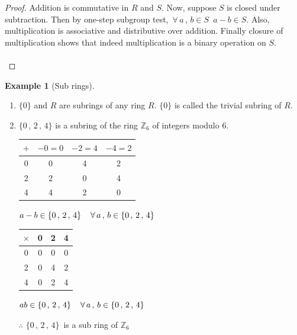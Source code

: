\documentclass[11pt,a4paper]{article}
\theoremstyle{definition}
\newtheorem{exa}[thm]{Example}
\begin{document}
\begin{proof}
Addition is commutative in $R$ and $S$. Now, suppose $S$ is closed under subtraction. Then by one-step subgroup test, $\, \forall\, a\, , \, b\in S\,\,\, a-b\in S$. Also, multiplication is associative and distributive over addition. Finally closure of multiplication shows that indeed multiplication is a binary operation on $S$.\\\\








\pagebreak
\end{proof}
\begin{exa}[Sub rings]
\begin{enumerate}
\item $\{0\}$ and $R$ are subrings of any ring $R$. $\{0\}$ is called the trivial subring of $R$.

\item $\{0\,, \, 2\, , \, 4\}$ is a subring of the ring $\mathbb{Z}_6$ of integers modulo 6.\\

\begin{table}[H]
\centering
\begin{tabular}{c|c|c|c}
$+$ & $-0 = 0$ & $-2 = 4$ & $-4 = 2$\\
\hline
0 & 0 & 4 & 2\\
2 & 2 & 0 & 4\\
4 & 4 & 2 & 0\\
\hline
\end{tabular}
\hspace{1.5cm} $a - b \in \{0\, , \, 2 \, , \, 4\}\hspace{0.4cm}\forall\, a\, , \, b\in \{0\, , \, 2 \, , \, 4\}$
\end{table}


\begin{table}[H]
\centering
\begin{tabular}{|c|c|c|c|}
\hline
$\times$ & 0 & 2 & 4\\
\hline
0 & 0 & 0 & 0 \\
2 & 0 & 4 & 2\\
4 & 0 & 2 & 4\\
\hline
\end{tabular}
\hspace{1.5cm} $ab\in \{0\, , \, 2 \, , \, 4\}\hspace{0.4cm}\forall\, a\, , \, b \in\{0\, , \, 2 \, , \, 4\}$
\end{table}
$\therefore\,\, \{0\, , \, 2 \, , \, 4\}\,$ is a sub ring of $\mathbb{Z}_6$\\



\end{enumerate}
\end{exa}
\end{document}
